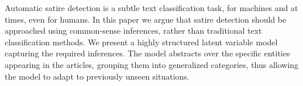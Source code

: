 Automatic satire detection is a subtle text classification task, for machines and at times, even for humans. In this paper we argue that satire detection should be approached using common-sense inferences, rather than traditional text classification methods. We present a highly structured latent variable model capturing the required inferences. The model abstracts over the specific entities appearing in the articles, grouping them into generalized categories, thus allowing the model to adapt to previously unseen situations.
